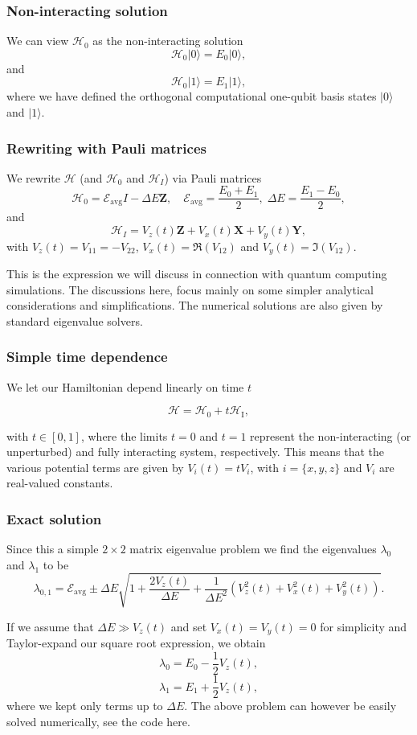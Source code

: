 \documentclass{beamer}
\begin{document}
\begin{frame}
\frametitle{Non-interacting solution}

We can view $\mathcal{H}_0$ as the non-interacting solution
\[
       \mathcal{H}_0\vert 0 \rangle =E_0\vert 0 \rangle,
\]
and
\[
       \mathcal{H}_0\vert 1\rangle =E_1\vert 1\rangle,
\]
where we have defined the orthogonal computational one-qubit basis states $\vert 0\rangle$ and $\vert 1\rangle$.
\end{frame}

\begin{frame}
\frametitle{Rewriting with Pauli matrices}

We rewrite $\mathcal{H}$ (and $\mathcal{H}_0$ and $\mathcal{H}_I$)  via Pauli matrices
\[
\mathcal{H}_0 = \mathcal{E}_{\mathrm{avg}} I -\Delta E \bm{Z}, \quad \mathcal{E}_{\mathrm{avg}} = \frac{E_0
  + E_1}{2}, \; \Delta E = \frac{E_1-E_0}{2},
\]
and
\[
\mathcal{H}_I = V_z(t)\bm{Z} + V_x(t)\bm{X}+V_y(t)\bm{Y},
\]
with $V_z(t) = V_{11}=-V_{22}$, $V_x(t) = \Re (V_{12})$ and $V_y(t) = \Im (V_{12})$.

This is the expression we will discuss in connection with quantum computing simulations. The discussions here, focus mainly on some simpler analytical considerations and simplifications. The numerical solutions are also given by standard eigenvalue solvers.
\end{frame}

\begin{frame}
\frametitle{Simple time dependence}

We let our Hamiltonian depend linearly on time  $t$

\[
\mathcal{H}=\mathcal{H}_0+t \mathcal{H}_\mathrm{I},
\]

with $t \in [0,1]$, where the limits $t=0$ and $t=1$
represent the non-interacting (or unperturbed) and fully interacting
system, respectively. This means that the various potential terms are given by $V_i(t)=tV_i$, with $i=\{x,y,z\}$ and $V_i$ are real-valued constants.
\end{frame}

\begin{frame}
\frametitle{Exact solution}

Since this a simple $2\times 2$ matrix eigenvalue problem we find the eigenvalues $\lambda_0$ and $\lambda_1$ to be
\[
\lambda_{0,1}=\mathcal{E}_{\mathrm{avg}}\pm \Delta E\sqrt{1+\frac{2V_z(t)}{\Delta E}+\frac{1}{\Delta E^2}(V_z^2(t)+V_x^2(t)+V_y^2(t))}.
\]

If we assume that $\Delta E \gg V_z(t)$ and set $V_x(t)=V_y(t)=0$ for
simplicity and Taylor-expand our square root expression, we obtain
\[
\lambda_{0}=E_0-\frac{1}{2}V_z(t),
\]
\[
\lambda_{1}=E_1+\frac{1}{2}V_z(t),
\]
where we kept only terms up to $\Delta E$. The above problem can however be easily solved numerically, see the code here.
\end{frame}
\end{document}
